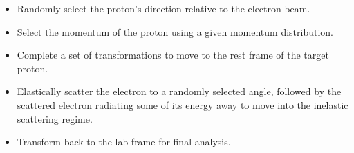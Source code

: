 \documentclass[landscape,a0paper,fontscale=0.285]{baposter} %
\begin{document}
\begin{poster}
{\begin{itemize}
\item Randomly select the proton's direction relative to the electron beam.
\item Select the momentum of the proton using a given momentum distribution.
\item Complete a set of transformations to move to the rest frame of the target proton.
\item Elastically scatter the electron to a randomly selected angle, followed by the scattered electron radiating some of its energy away to move into the inelastic scattering regime. 
\item Transform back to the lab frame for final analysis.
\end{itemize}
}






\end{poster}
\end{document}
